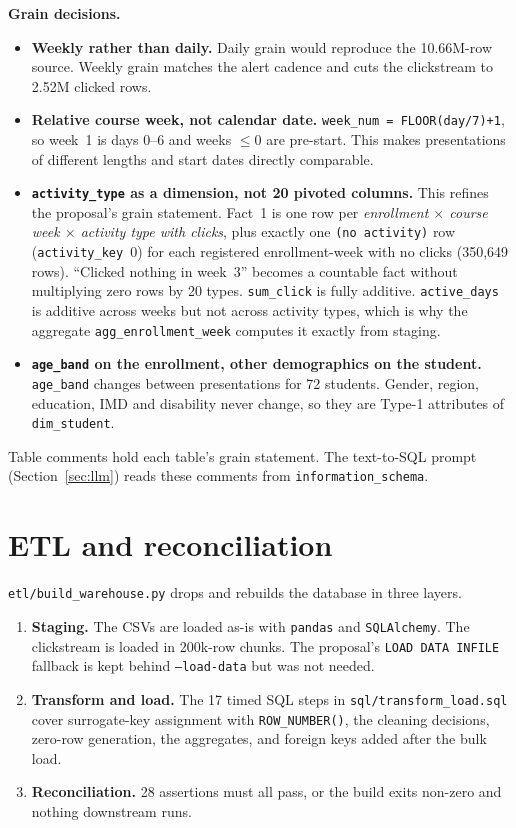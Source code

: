\documentclass[10pt,letterpaper]{article}
\renewcommand{\tt}[1]{\texttt{#1}}
\begin{document}
\textbf{Grain decisions.}
\begin{itemize}
\item \textbf{Weekly rather than daily.} Daily grain would reproduce the 10.66M-row source. Weekly grain matches
the alert cadence and cuts the clickstream to 2.52M clicked rows.
\item \textbf{Relative course week, not calendar date.} \tt{week\_num = FLOOR(day/7)+1}, so week~1 is days 0--6
and weeks $\le 0$ are pre-start. This makes presentations of different lengths and start dates directly comparable.
\item \textbf{\tt{activity\_type} as a dimension, not 20 pivoted columns.} This refines the proposal's grain
statement. Fact~1 is one row per \emph{enrollment $\times$ course week $\times$ activity type with clicks}, plus
exactly one \tt{(no activity)} row (\tt{activity\_key}~0) for each registered enrollment-week with no clicks
(350,649 rows). ``Clicked nothing in week~3'' becomes a countable fact without multiplying zero rows by 20 types.
\tt{sum\_click} is fully additive. \tt{active\_days} is additive across weeks but not across activity types,
which is why the aggregate \tt{agg\_enrollment\_week} computes it exactly from staging.
\item \textbf{\tt{age\_band} on the enrollment, other demographics on the student.} \tt{age\_band} changes
between presentations for 72 students. Gender, region, education, IMD and disability never change, so they are
Type-1 attributes of \tt{dim\_student}.
\end{itemize}
Table comments hold each table's grain statement. The text-to-SQL prompt (Section~\ref{sec:llm}) reads these
comments from \tt{information\_schema}.

\section{ETL and reconciliation}\label{sec:etl}
\tt{etl/build\_warehouse.py} drops and rebuilds the database in three layers.
\begin{enumerate}
\item \textbf{Staging.} The CSVs are loaded as-is with \tt{pandas} and \tt{SQLAlchemy}. The clickstream is loaded
in 200k-row chunks. The proposal's \tt{LOAD DATA INFILE} fallback is kept behind \tt{--load-data} but was not
needed.
\item \textbf{Transform and load.} The 17 timed SQL steps in \tt{sql/transform\_load.sql} cover surrogate-key
assignment with \tt{ROW\_NUMBER()}, the cleaning decisions, zero-row generation, the aggregates, and foreign keys
added after the bulk load.
\item \textbf{Reconciliation.} 28 assertions must all pass, or the build exits non-zero and nothing downstream
runs.
\end{enumerate}
\end{document}
